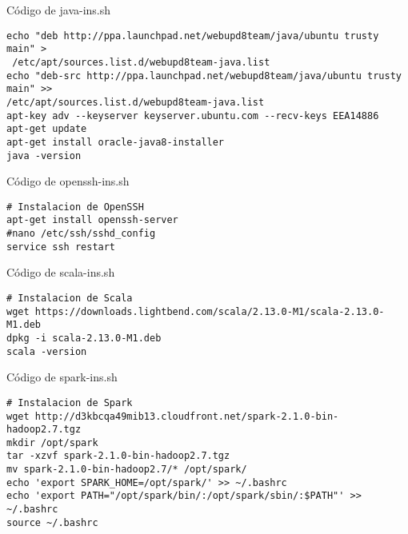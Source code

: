 Código de java-ins.sh
\\
\begin{lstlisting}
echo "deb http://ppa.launchpad.net/webupd8team/java/ubuntu trusty main" >
 /etc/apt/sources.list.d/webupd8team-java.list
echo "deb-src http://ppa.launchpad.net/webupd8team/java/ubuntu trusty main" >> 
/etc/apt/sources.list.d/webupd8team-java.list
apt-key adv --keyserver keyserver.ubuntu.com --recv-keys EEA14886
apt-get update
apt-get install oracle-java8-installer
java -version
\end{lstlisting}
Código de openssh-ins.sh
\begin{lstlisting}
# Instalacion de OpenSSH
apt-get install openssh-server
#nano /etc/ssh/sshd_config
service ssh restart
\end{lstlisting} 
Código de scala-ins.sh
\begin{lstlisting}
# Instalacion de Scala
wget https://downloads.lightbend.com/scala/2.13.0-M1/scala-2.13.0-M1.deb
dpkg -i scala-2.13.0-M1.deb
scala -version
\end{lstlisting} 
Código de spark-ins.sh
\begin{lstlisting}
# Instalacion de Spark
wget http://d3kbcqa49mib13.cloudfront.net/spark-2.1.0-bin-hadoop2.7.tgz
mkdir /opt/spark
tar -xzvf spark-2.1.0-bin-hadoop2.7.tgz
mv spark-2.1.0-bin-hadoop2.7/* /opt/spark/
echo 'export SPARK_HOME=/opt/spark/' >> ~/.bashrc
echo 'export PATH="/opt/spark/bin/:/opt/spark/sbin/:$PATH"' >> ~/.bashrc
source ~/.bashrc
\end{lstlisting}
